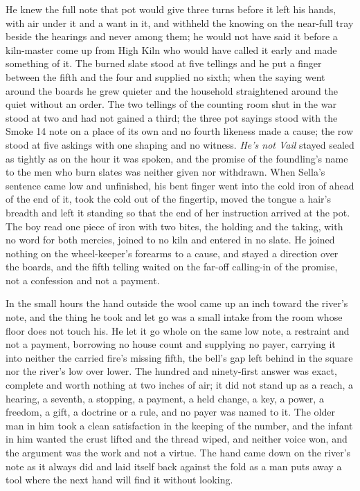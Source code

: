He knew the full note that pot would give three turns before it left his hands, with air under it and a want in it, and withheld the knowing on the near-full tray beside the hearings and never among them; he would not have said it before a kiln-master come up from High Kiln who would have called it early and made something of it. The burned slate stood at five tellings and he put a finger between the fifth and the four and supplied no sixth; when the saying went around the boards he grew quieter and the household straightened around the quiet without an order. The two tellings of the counting room shut in the war stood at two and had not gained a third; the three pot sayings stood with the Smoke 14 note on a place of its own and no fourth likeness made a cause; the row stood at five askings with one shaping and no witness. \emph{He's not Vail} stayed sealed as tightly as on the hour it was spoken, and the promise of the foundling's name to the men who burn slates was neither given nor withdrawn. When Sella's sentence came low and unfinished, his bent finger went into the cold iron of  ahead of the end of it, took the cold out of the fingertip, moved the tongue a hair's breadth and left it standing so that the end of her instruction arrived at the pot. The boy read one piece of iron with two bites, the holding and the taking, with no  word for both mercies, joined to no kiln and entered in no slate. He joined nothing on the wheel-keeper's forearms to a cause, and  stayed a direction over the boards, and the fifth telling waited on the far-off calling-in of the promise, not a confession and not a payment.

In the small hours the hand outside the wool came up an inch toward the river's note, and the thing he took and let go was a small intake from the room whose floor does not touch his. He let it go whole on the same low note, a restraint and not a payment, borrowing no house count and supplying no payer, carrying it into neither the carried fire's missing fifth, the bell's gap left behind in the square nor the river's low over lower. The hundred and ninety-first answer was exact, complete and worth nothing at two inches of air; it did not stand up as a reach, a hearing, a seventh, a stopping, a payment, a held change, a key, a power, a freedom, a gift, a doctrine or a rule, and no payer was named to it. The older man in him took a clean satisfaction in the keeping of the number, and the infant in him wanted the crust lifted and the thread wiped, and neither voice won, and the argument was the work and not a virtue. The hand came down on the river's note as it always did and laid itself back against the fold as a man puts away a tool where the next hand will find it without looking.

